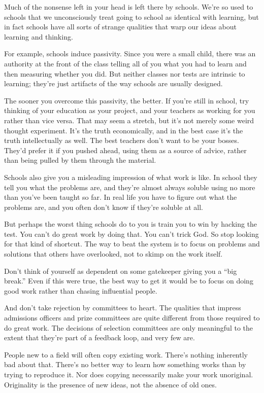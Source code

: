 Much of the nonsense left in your head is left there by schools. We're
so used to schools that we unconsciously treat going to school as
identical with learning, but in fact schools have all sorts of strange
qualities that warp our ideas about learning and thinking.

For example, schools induce passivity. Since you were a small child,
there was an authority at the front of the class telling all of you what
you had to learn and then measuring whether you did. But neither classes
nor tests are intrinsic to learning; they're just artifacts of the way
schools are usually designed.

The sooner you overcome this passivity, the better. If you're still in
school, try thinking of your education as your project, and your
teachers as working for you rather than vice versa. That may seem a
stretch, but it's not merely some weird thought experiment. It's the
truth economically, and in the best case it's the truth intellectually
as well. The best teachers don't want to be your bosses. They'd prefer
it if you pushed ahead, using them as a source of advice, rather than
being pulled by them through the material.

Schools also give you a misleading impression of what work is like. In
school they tell you what the problems are, and they're almost always
soluble using no more than you've been taught so far. In real life you
have to figure out what the problems are, and you often don't know if
they're soluble at all.

But perhaps the worst thing schools do to you is train you to win by
hacking the test. You can't do great work by doing that. You can't trick
God. So stop looking for that kind of shortcut. The way to beat the
system is to focus on problems and solutions that others have
overlooked, not to skimp on the work itself.

Don't think of yourself as dependent on some gatekeeper giving you a
``big break.'' Even if this were true, the best way to get it would be
to focus on doing good work rather than chasing influential people.

And don't take rejection by committees to heart. The qualities that
impress admissions officers and prize committees are quite different
from those required to do great work. The decisions of selection
committees are only meaningful to the extent that they're part of a
feedback loop, and very few are.

People new to a field will often copy existing work. There's nothing
inherently bad about that. There's no better way to learn how something
works than by trying to reproduce it. Nor does copying necessarily make
your work unoriginal. Originality is the presence of new ideas, not the
absence of old ones.

